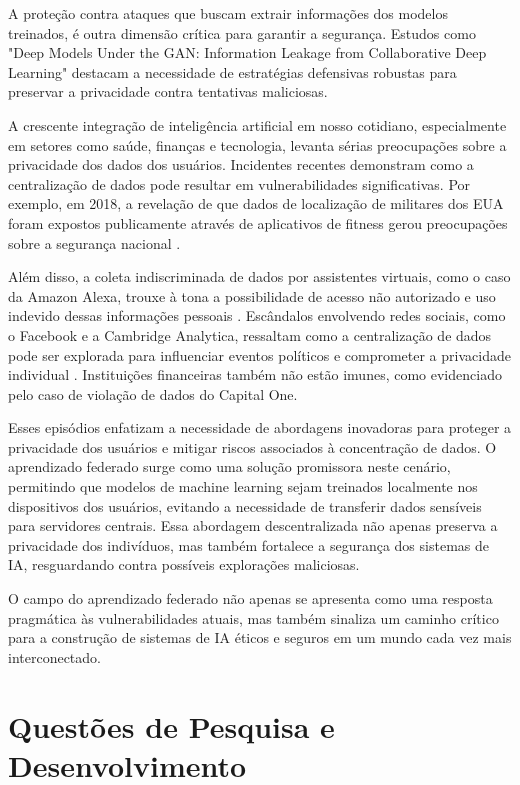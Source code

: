 A proteção contra ataques que buscam extrair informações dos modelos treinados, é outra dimensão crítica para garantir a segurança. Estudos como "Deep Models Under the GAN: Information Leakage from Collaborative Deep Learning"\cite{hitaj2017deep} destacam a necessidade de estratégias defensivas robustas para preservar a privacidade contra tentativas maliciosas.

A crescente integração de inteligência artificial em nosso cotidiano, especialmente em setores como saúde, finanças e tecnologia, levanta sérias preocupações sobre a privacidade dos dados dos usuários. Incidentes recentes demonstram como a centralização de dados pode resultar em vulnerabilidades significativas. Por exemplo, em 2018, a revelação de que dados de localização de militares dos EUA foram expostos publicamente através de aplicativos de fitness gerou preocupações sobre a segurança nacional \cite{bbc2018strava}. 

Além disso, a coleta indiscriminada de dados por assistentes virtuais, como o caso da Amazon Alexa, trouxe à tona a possibilidade de acesso não autorizado e uso indevido dessas informações pessoais \cite{bloomberg2019amazon}. Escândalos envolvendo redes sociais, como o Facebook e a Cambridge Analytica, ressaltam como a centralização de dados pode ser explorada para influenciar eventos políticos e comprometer a privacidade individual \cite{guardian2018cambridge}. Instituições financeiras também não estão imunes, como evidenciado pelo caso de violação de dados do Capital One\cite{capitalone2019databreach}. 

Esses episódios enfatizam a necessidade de abordagens inovadoras para proteger a privacidade dos usuários e mitigar riscos associados à concentração de dados. O aprendizado federado surge como uma solução promissora neste cenário, permitindo que modelos de machine learning sejam treinados localmente nos dispositivos dos usuários, evitando a necessidade de transferir dados sensíveis para servidores centrais. Essa abordagem descentralizada não apenas preserva a privacidade dos indivíduos, mas também fortalece a segurança dos sistemas de IA, resguardando contra possíveis explorações maliciosas. 

O campo do aprendizado federado não apenas se apresenta como uma resposta pragmática às vulnerabilidades atuais, mas também sinaliza um caminho crítico para a construção de sistemas de IA éticos e seguros em um mundo cada vez mais interconectado.

\section{Questões de Pesquisa e Desenvolvimento}
\label{sec:questoes}

